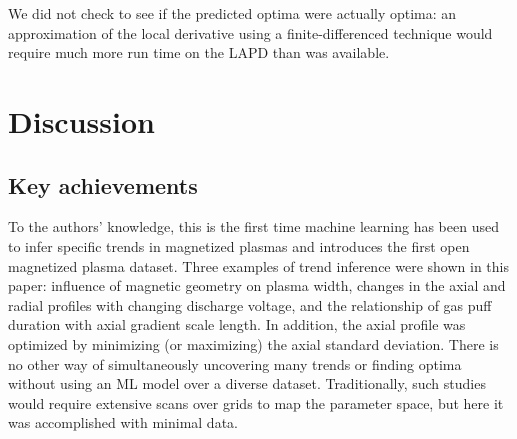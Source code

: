We did not check to see if the predicted optima were actually optima: an approximation of the local derivative using a finite-differenced technique would require much more run time on the LAPD than was available. 

\section{Discussion}
\label{sec:discussion}


\subsection{Key achievements}


To the authors' knowledge, this is the first time machine learning has been used to infer specific trends in magnetized plasmas and introduces the first open magnetized plasma dataset. Three examples of trend inference were shown in this paper: influence of magnetic geometry on plasma width, changes in the axial and radial profiles with changing discharge voltage, and the relationship of gas puff duration with axial gradient scale length. In addition, the axial profile was optimized by minimizing (or maximizing) the axial standard deviation. There is no other way of simultaneously uncovering many trends or finding optima without using an ML model over a diverse dataset. Traditionally, such studies would require extensive scans over grids to map the parameter space, but here it was accomplished with minimal data.

